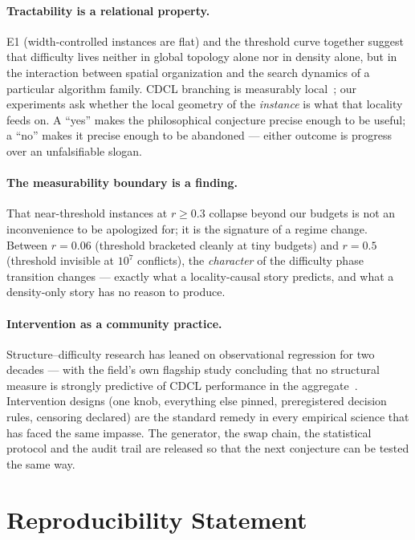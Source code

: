\documentclass[manuscript, screen, review]{jair}
\begin{document}
\paragraph{Tractability is a relational property.}
E1 (width-controlled instances are flat) and the threshold curve together
suggest that difficulty lives neither in global topology alone nor in density
alone, but in the interaction between spatial organization and the search
dynamics of a particular algorithm family. CDCL branching is measurably
local~\cite{zulkoski2018}; our experiments ask whether the local geometry of
the \emph{instance} is what that locality feeds on. A ``yes'' makes the
philosophical conjecture precise enough to be useful; a ``no'' makes it
precise enough to be abandoned --- either outcome is progress over an
unfalsifiable slogan.

\paragraph{The measurability boundary is a finding.}
That near-threshold instances at $r\ge0.3$ collapse beyond our budgets is not
an inconvenience to be apologized for; it is the signature of a regime
change. Between $r=0.06$ (threshold bracketed cleanly at tiny budgets) and
$r=0.5$ (threshold invisible at $10^7$ conflicts), the \emph{character} of the
difficulty phase transition changes --- exactly what a locality-causal story
predicts, and what a density-only story has no reason to produce.

\paragraph{Intervention as a community practice.}
Structure--difficulty research has leaned on observational regression for two
decades --- with the field's own flagship study concluding that no structural
measure is strongly predictive of CDCL performance in the
aggregate~\cite{zulkoski2018}.
Intervention designs (one knob, everything else pinned, preregistered
decision rules, censoring declared) are the standard remedy in every
empirical science that has faced the same impasse. The generator, the swap
chain, the statistical protocol and the audit trail are released so that the
next conjecture can be tested the same way.

\section{Reproducibility Statement}
\label{sec:repro}
\end{document}
